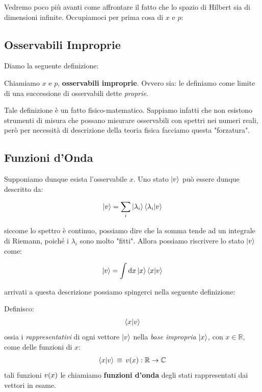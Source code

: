 	Vedremo poco più avanti come affrontare il fatto che lo spazio di Hilbert sia di dimensioni infinite. Occupiamoci per prima cosa di $x$ e $p$:

\subsection{Osservabili Improprie}

	Diamo la seguente definizione:
	
\begin{mydef}
	Chiamiamo $x$ e $p$, \textbf{osservabili improprie}. Ovvero sia: le definiamo come limite di una successione di osservabili dette \textit{proprie}.
\end{mydef}

	Tale definizione è un fatto fisico-matematico. Sappiamo infatti che non esistono strumenti di misura che possano misurare osservabili con spettri nei numeri reali, però per necessità di descrizione della teoria fisica facciamo questa "forzatura".

\subsection{Funzioni d'Onda}

	Supponiamo dunque esista l'osservabile $x$. Uno stato $\ket{v}$ può essere dunque descritto da:
	
\begin{align*}	
	\ket{v} = \sum_i \ket{\lambda_i} \braket{\lambda_i}{v}
\end{align*}

	siccome lo spettro è continuo, possiamo dire che la somma tende ad un integrale di Riemann, poiché i $\lambda_i$ sono molto "fitti". Allora possiamo riscrivere lo stato $\ket{v}$ come:
	
\begin{align*}
	\ket{v} = \int \dd x \ket{x} \braket{x}{v}
\end{align*}

	arrivati a questa descrizione possiamo spingerci nella seguente definizione:

\begin{mydef}
	Definisco:
\begin{align*}
	\braket{x}{v}
\end{align*}
	ossia i \textit{rappresentativi} di ogni vettore $\ket{v}$ nella \textit{base impropria} $\ket{x}$, con $x \in \mathbb{R}$, come delle funzioni di $x$:
\begin{align*}
	\braket{x}{v} \, \equiv \, v\qty(x) : \mathbb{R} \to \mathbb{C}
\end{align*}
	tali funzioni $v\qty(x)$ le chiamiamo \textbf{funzioni d'onda} degli stati rappresentati dai vettori in esame.
\end{mydef}


